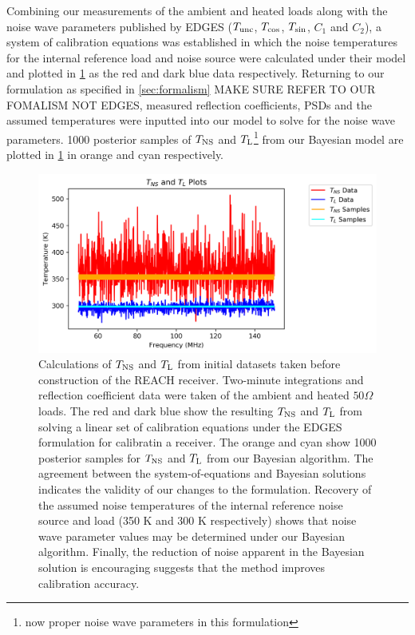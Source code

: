 Combining our measurements of the ambient and heated loads along with the noise wave parameters published by EDGES ($T_{\mathrm{unc}}$, $T_{\mathrm{cos}}$, $T_{\mathrm{sin}}$, $C_1$ and $C_2$), a system of calibration equations was established in which the noise temperatures for the internal reference load and noise source were calculated under their model and plotted in \cref{fig:mphil_result} as the red and dark blue data respectively. Returning to our formulation as specified in \cref{sec:formalism} MAKE SURE REFER TO OUR FOMALISM NOT EDGES, measured reflection coefficients, PSDs and the assumed temperatures were inputted into our model to solve for the noise wave parameters. 1000 posterior samples of $T_{\mathrm{NS}}$ and $T_{\mathrm{L}}$\footnote{now proper noise wave parameters in this formulation} from our Bayesian model are plotted in \cref{fig:mphil_result} in orange and cyan respectively.
\begin{figure}
    \centering
    \includegraphics[width=.8\textwidth]{mphil_result}
    \caption{Calculations of $T_{\mathrm{NS}}$ and $T_{\mathrm{L}}$ from initial datasets taken before construction of the REACH receiver. Two-minute integrations and reflection coefficient data were taken of the ambient and heated $50 \Omega$ loads. The red and dark blue show the resulting $T_{\mathrm{NS}}$ and $T_{\mathrm{L}}$ from solving a linear set of calibration equations under the EDGES formulation for calibratin a receiver. The orange and cyan show 1000 posterior samples for $T_{\mathrm{NS}}$ and $T_{\mathrm{L}}$ from our Bayesian algorithm. The agreement between the system-of-equations and Bayesian solutions indicates the validity of our changes to the formulation. Recovery of the assumed noise temperatures of the internal reference noise source and load (350 K and 300 K respectively) shows that noise wave parameter values may be determined under our Bayesian algorithm. Finally, the reduction of noise apparent in the Bayesian solution is encouraging suggests that the method improves calibration accuracy.}
    \label{fig:mphil_result}
\end{figure}


